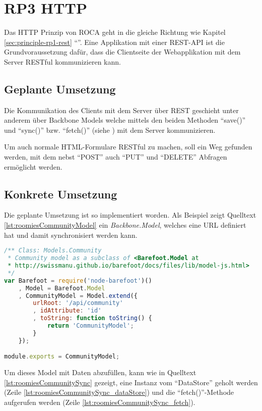 \section{RP3 HTTP}
\label{sec:principle-rp3-http}

Das HTTP Prinzip von ROCA geht in die gleiche Richtung wie Kapitel \ref{sec:principle-rp1-rest} ``''.
Eine Applikation mit einer \gls{REST}-API ist die Grundvoraussetzung dafür, dass die Clientseite der Webapplikation mit dem Server \gls{RESTful} kommunizieren kann.

\subsection*{Geplante Umsetzung}
Die Kommunikation des Clients mit dem Server über \gls{REST} geschieht unter anderem über Backbone Models welche mittels den beiden Methoden ``save()'' und ``sync()'' bzw. ``fetch()'' (siehe \cite{BackboneSync}) mit dem Server kommunizieren.

Um auch normale HTML-Formulare \gls{RESTful} zu machen, soll ein Weg gefunden werden, mit dem nebst ``POST'' auch ``PUT'' und ``DELETE'' Abfragen ermöglicht werden.

\subsection*{Konkrete Umsetzung}
Die geplante Umsetzung ist so implementiert worden. Als Beispiel zeigt Quelltext \ref{lst:roomiesCommunityModel} ein \emph{Backbone.Model}, welches eine URL definiert hat und damit synchronisiert werden kann.

\begin{lstlisting}[language=JavaScript, caption=Community Model \cite{roomiesCommunityModel}, label=lst:roomiesCommunityModel]
/** Class: Models.Community
 * Community model as a subclass of <Barefoot.Model at
 * http://swissmanu.github.io/barefoot/docs/files/lib/model-js.html>
 */
var Barefoot = require('node-barefoot')()
	, Model = Barefoot.Model
	, CommunityModel = Model.extend({
		urlRoot: '/api/community'
		, idAttribute: 'id'
		, toString: function toString() {
			return 'CommunityModel';
		}
	});

module.exports = CommunityModel;
\end{lstlisting}

Um dieses Model mit Daten abzufüllen, kann wie in Quelltext \ref{lst:roomiesCommunitySync} gezeigt, eine Instanz vom ``DataStore'' geholt werden (Zeile \ref{lst:roomiesCommunitySync_dataStore}) und die ``fetch()''-Methode aufgerufen werden (Zeile \ref{lst:roomiesCommunitySync_fetch}).

